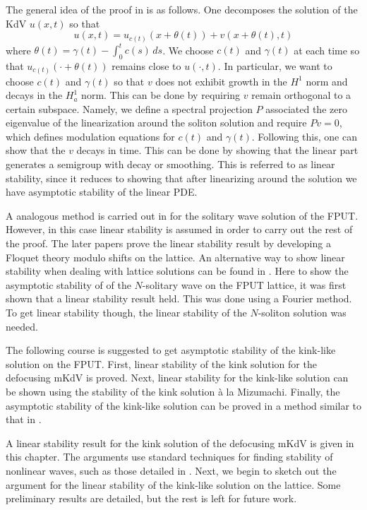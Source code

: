The general idea of the proof in \cite{pego1994asymptotic} is as follows. One decomposes the solution of the KdV \(u(x,t)\) so that
\begin{equation}
	u(x,t)  = u_{c(t)} (x + \theta(t)) + v(x + \theta(t), t)
\end{equation}
where \(\theta(t) = \gamma(t) - \int_0^t c(s)\, ds\). We choose \(c(t)\) and \(\gamma(t)\) at each time so that \(u_{c(t)} (\cdot + \theta(t))\) remains close to \(u(\cdot, t)\). In particular, we want to choose \(c(t)\) and \(\gamma(t)\) so that \(v\) does not exhibit growth in the \(H^1\) norm and decays in the \(H^1_a\) norm. This can be done by requiring \(v\) remain orthogonal to a certain subspace. Namely, we define a spectral projection \(P\) associated the zero eigenvalue of the linearization around the soliton solution and require \(P v = 0\), which defines modulation equations for \(c(t)\) and \(\gamma(t)\). Following this, one can show that the \(v\) decays in time. This can be done by showing that the linear part generates a semigroup with decay or smoothing. This is referred to as linear stability, since it reduces to showing that after linearizing around the solution we have asymptotic stability of the linear PDE.

A analogous method is carried out in \cite{friesecke2002solitary} for the solitary wave solution of the FPUT. However, in this case linear stability is assumed in order to carry out the rest of the proof. The later papers \cite{friesecke2003solitary,friesecke2004solitary} prove the linear stability result by developing a Floquet theory modulo shifts on the lattice. An alternative way to show linear stability when dealing with lattice solutions can be found in \cite{mizumachi2013asymptotic}. Here to show the asymptotic stability of of the \(N\)-solitary wave on the FPUT lattice, it was first shown that a linear stability result held. This was done using a Fourier method. To get linear stability though, the linear stability of the \(N\)-soliton solution was needed.

The following course is suggested to get asymptotic stability of the kink-like solution on the FPUT. First, linear stability of the kink solution for the defocusing mKdV is proved. Next, linear stability for the kink-like solution can be shown using the stability of the kink solution \`a la Mizumachi. Finally, the asymptotic stability of the kink-like solution can be proved in a method similar to that in \cite{friesecke2002solitary}.

A linear stability result for the kink solution of the defocusing mKdV is given in this chapter. The arguments use standard techniques for finding stability of nonlinear waves, such as those detailed in \cite{kapitula2013spectral}. Next, we begin to sketch out the argument for the linear stability of the kink-like solution on the lattice. Some preliminary results are detailed, but the rest  is left for future work.
